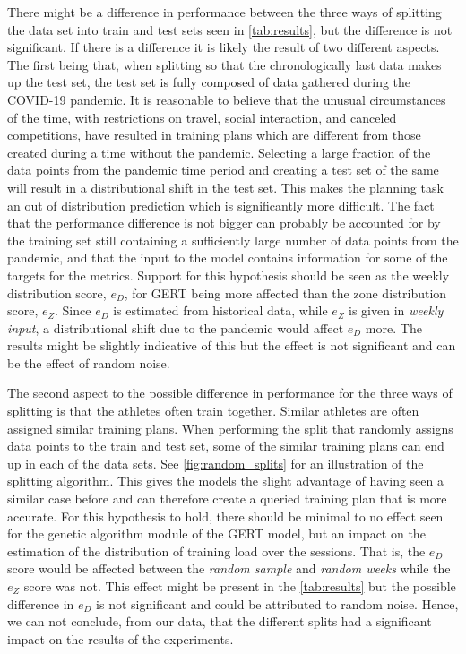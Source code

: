 There might be a difference in performance between the three ways of splitting the data set into train and test sets seen in \cref{tab:results}, but the difference is not significant.
If there is a difference it is likely the result of two different aspects.
The first being that, when splitting so that the chronologically last data makes up the test set, the test set is fully composed of data gathered during the COVID-19 pandemic.
It is reasonable to believe that the unusual circumstances of the time, with restrictions on travel, social interaction, and canceled competitions, have resulted in training plans which are different from those created during a time without the pandemic.
Selecting a large fraction of the data points from the pandemic time period and creating a test set of the same will result in a distributional shift in the test set.
This makes the planning task an out of distribution prediction which is significantly more difficult.
The fact that the performance difference is not bigger can probably be accounted for by the training set still containing a sufficiently large number of data points from the pandemic, and that the input to the model contains information for some of the targets for the metrics.
Support for this hypothesis should be seen as the weekly distribution score, $e_D$, for GERT being more affected than the zone distribution score, $e_Z$. 
Since $e_D$ is estimated from historical data, while $e_Z$ is given in \textit{weekly input}, a distributional shift due to the pandemic would affect $e_D$ more.
The results might be slightly indicative of this but the effect is not significant and can be the effect of random noise.

The second aspect to the possible difference in performance for the three ways of splitting is that the athletes often train together.
Similar athletes are often assigned similar training plans.
When performing the split that randomly assigns data points to the train and test set, some of the similar training plans can end up in each of the data sets.
See \cref{fig:random_splits} for an illustration of the splitting algorithm.
This gives the models the slight advantage of having seen a similar case before and can therefore create a queried training plan that is more accurate.
For this hypothesis to hold, there should be minimal to no effect seen for the genetic algorithm module of the GERT model, but an impact on the estimation of the distribution of training load over the sessions.
That is, the $e_D$ score would be affected between the \textit{random sample} and \textit{random weeks} while the $e_Z$ score was not.
This effect might be present in the \cref{tab:results} but the possible difference in $e_D$ is not significant and could be attributed to random noise.
Hence, we can not conclude, from our data, that the different splits had a significant impact on the results of the experiments.

